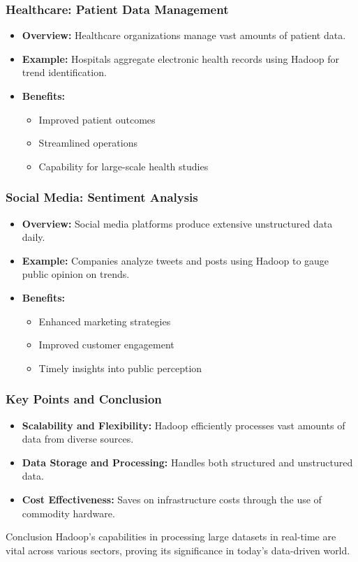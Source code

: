 \documentclass[aspectratio=169]{beamer}
\begin{document}
\begin{frame}[fragile]
    \frametitle{Healthcare: Patient Data Management}
    \begin{itemize}
        \item \textbf{Overview:} Healthcare organizations manage vast amounts of patient data.
        \item \textbf{Example:} Hospitals aggregate electronic health records using Hadoop for trend identification.
        \item \textbf{Benefits:}
        \begin{itemize}
            \item Improved patient outcomes
            \item Streamlined operations
            \item Capability for large-scale health studies
        \end{itemize}
    \end{itemize}
\end{frame}

\begin{frame}[fragile]
    \frametitle{Social Media: Sentiment Analysis}
    \begin{itemize}
        \item \textbf{Overview:} Social media platforms produce extensive unstructured data daily.
        \item \textbf{Example:} Companies analyze tweets and posts using Hadoop to gauge public opinion on trends.
        \item \textbf{Benefits:}
        \begin{itemize}
            \item Enhanced marketing strategies
            \item Improved customer engagement
            \item Timely insights into public perception
        \end{itemize}
    \end{itemize}
\end{frame}

\begin{frame}[fragile]
    \frametitle{Key Points and Conclusion}
    \begin{itemize}
        \item \textbf{Scalability and Flexibility:} Hadoop efficiently processes vast amounts of data from diverse sources.
        \item \textbf{Data Storage and Processing:} Handles both structured and unstructured data.
        \item \textbf{Cost Effectiveness:} Saves on infrastructure costs through the use of commodity hardware.
    \end{itemize}
    \begin{block}{Conclusion}
        Hadoop's capabilities in processing large datasets in real-time are vital across various sectors, proving its significance in today's data-driven world.
    \end{block}
\end{frame}
\end{document}
